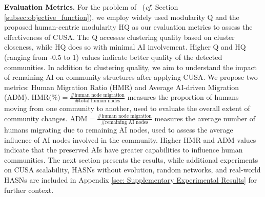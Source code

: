 \noindent\textbf{Evaluation Metrics.} For the problem of \problem\ (\textit{cf.} Section \ref{subsec:objective_function}), we employ widely used modularity Q \cite{newman2004finding} and the proposed human-centric modularity HQ as our evaluation metrics to assess the effectiveness of CUSA. The Q accesses clustering quality based on cluster closeness, while HQ does so with minimal AI involvement. Higher Q and HQ (ranging from -0.5 to 1) values indicate better quality of the detected communities. In addition to clustering quality, we aim to understand the impact of remaining AI on community structures after applying CUSA. We propose two metrics: Human Migration Ratio (HMR) and Average AI-driven Migration (ADM). $\text{HMR(\%)} = \frac{\text{\# human node migration}}{\text{\# total human nodes}}$ measures the proportion of humans moving from one community to another, used to evaluate the overall extent of community changes. $\text{ADM} = \frac{\text{\# human node migration}}{\text{\# remaining AI nodes}}$ measures the average number of humans migrating due to remaining AI nodes, used to assess the average influence of AI nodes involved in the community. Higher HMR and ADM values indicate that the preserved AIs have greater capabilities to influence human communities. The next section presents the results, while additional experiments on CUSA scalability, HASNs without evolution, random networks, and real-world HASNs are included in Appendix \ref{sec: Supplementary Experimental Results} for further context.


